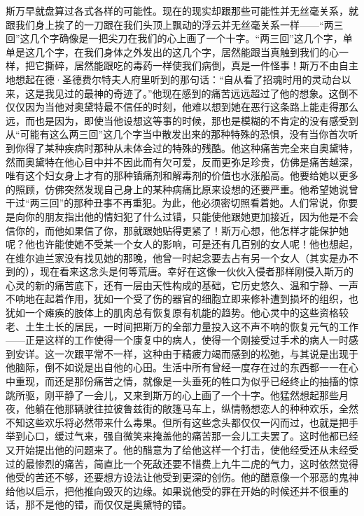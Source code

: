 \par 斯万早就盘算过各式各样的可能性。现在的现实却跟那些可能性并无丝毫关系，就跟我们身上挨了的一刀跟在我们头顶上飘动的浮云并无丝毫关系一样——“两三回”这几个字确像是一把尖刀在我们的心上画了一个十字。“两三回”这几个字，单单是这几个字，在我们身体之外发出的这几个字，居然能跟当真触到我们的心一样，把它撕碎，居然能跟吃的毒药一样使我们病倒，真是一件怪事！斯万不由自主地想起在德·圣德费尔特夫人府里听到的那句话：“自从看了招魂时用的灵动台以来，这是我见过的最神的奇迹了。”他现在感到的痛苦远远超过了他的想象。这倒不仅仅因为当他对奥黛特最不信任的时刻，他难以想到她在恶行这条路上能走得那么远，而也是因为，即使当他设想这等事的时候，那也是模糊的不肯定的没有感受到从“可能有这么两三回”这几个字当中散发出来的那种特殊的恐惧，没有当你首次听到你得了某种疾病时那种从未体会过的特殊的残酷。他这种痛苦完全来自奥黛特，然而奥黛特在他心目中并不因此而有欠可爱，反而更弥足珍贵，仿佛是痛苦越深，唯有这个妇女身上才有的那种镇痛剂和解毒剂的价值也水涨船高。他要给她以更多的照顾，仿佛突然发现自己身上的某种病痛比原来设想的还要严重。他希望她说曾干过“两三回”的那种丑事不再重犯。为此，他必须密切照看着她。人们常说，你要是向你的朋友指出他的情妇犯了什么过错，只能使他跟她更加接近，因为他是不会信你的，而他如果信了你，那就跟她贴得更紧了！斯万心想，他怎样才能保护她呢？他也许能使她不受某一个女人的影响，可是还有几百别的女人呢！他也想起，在维尔迪兰家没有找见她的那晚，他曾一时起念要去占有另一个女人（其实是办不到的），现在看来这念头是何等荒唐。幸好在这像一伙伙入侵者那样刚侵入斯万的心灵的新的痛苦底下，还有一层由天性构成的基础，它历史悠久、温和宁静、一声不响地在起着作用，犹如一个受了伤的器官的细胞立即来修补遭到损坏的组织，也犹如一个瘫痪的肢体上的肌肉总有恢复原有机能的趋势。他心灵中的这些资格较老、土生土长的居民，一时间把斯万的全部力量投入这不声不响的恢复元气的工作——正是这样的工作使得一个康复中的病人，使得一个刚接受过手术的病人一时感到安详。这一次跟平常不一样，这种由于精疲力竭而感到的松弛，与其说是出现于他脑际，倒不如说是出自他的心田。生活中所有曾经一度存在过的东西都一一在心中重现，而还是那份痛苦之情，就像是一头垂死的牲口为似乎已经终止的抽搐的惊跳所驱，刚平静了一会儿，又来到斯万的心上画了一个十字。他猛然想起那些月夜，他躺在他那辆驶往拉彼鲁兹街的敞篷马车上，纵情畅想恋人的种种欢乐，全然不知这些欢乐将必然带来什么毒果。但所有这些念头都仅仅一闪而过，也就是把手举到心口，缓过气来，强自微笑来掩盖他的痛苦那一会儿工夫罢了。这时他都已经又开始提出他的问题来了。他的醋意为了给他这样一个打击，使他经受还从未经受过的最惨烈的痛苦，简直比一个死敌还要不惜费上九牛二虎的气力，这时依然觉得他受的苦还不够，还要想方设法让他受到更深的创伤。他的醋意像一个邪恶的鬼神给他以启示，把他推向毁灭的边缘。如果说他受的罪在开始的时候还并不很重的话，那不是他的错，而仅仅是奥黛特的错。
